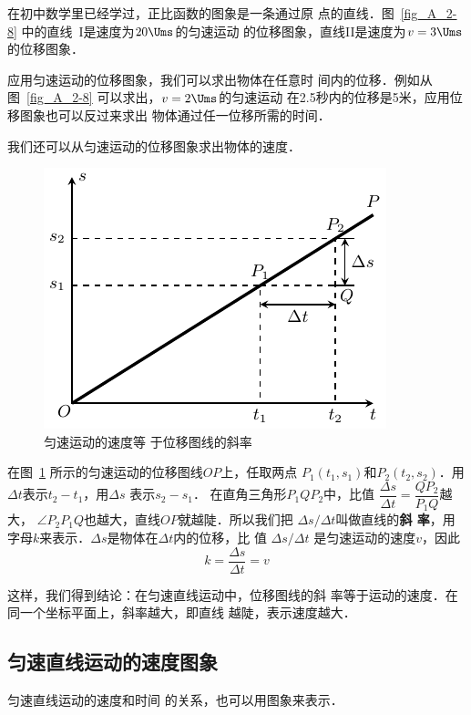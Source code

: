 在初中数学里已经学过，正比函数的图象是一条通过原
点的直线．图~\ref{fig_A_2-8} 中的直线~I是速度为$20 \Ums$的匀速运动
的位移图象，直线II是速度为$v=3 \Ums$的位移图象．


    应用匀速运动的位移图象，我们可以求出物体在任意时
间内的位移．例如从图~\ref{fig_A_2-8} 可以求出，$v=2\Ums$的匀速运动
在2.5秒内的位移是5米，应用位移图象也可以反过来求出
物体通过任一位移所需的时间．


我们还可以从匀速运动的位移图象求出物体的速度．

\begin{figure}[htp]
    \centering
    \includegraphics{fig/A/2-9.pdf}
    \caption{匀速运动的速度等
    于位移图线的斜率}\label{fig_A_2-9}
\end{figure}

    在图~\ref{fig_A_2-9} 所示的匀速运动的位移图线$OP$上，任取两点
    $P_1(t_1,s_1)$和$P_2(t_2,s_2)$．用$\Delta t$表示$t_2-t_1$，用$\Delta s$
    表示$s_2-s_1$．
    在直角三角形$P_1QP_2$中，比值
    $\dfrac{\Delta s}{\Delta t}=\dfrac{QP_2}{P_1Q}$越大，
$\angle P_2P_1Q$也越大，直线$OP$就越陡．所以我们把
$\Delta s/\Delta t$叫做直线的\textbf{斜
率}，用字母$k$来表示．$\Delta s$是物体在$\Delta t$内的位移，比
值 $\Delta s/\Delta t$
是匀速运动的速度$v$，因此
\[k=\frac{\Delta s}{\Delta t}=v\]

这样，我们得到结论：在匀速直线运动中，位移图线的斜
率等于运动的速度．在同一个坐标平面上，斜率越大，即直线
越陡，表示速度越大．

 
\subsection{匀速直线运动的速度图象} 

匀速直线运动的速度和时间
的关系，也可以用图象来表示．

